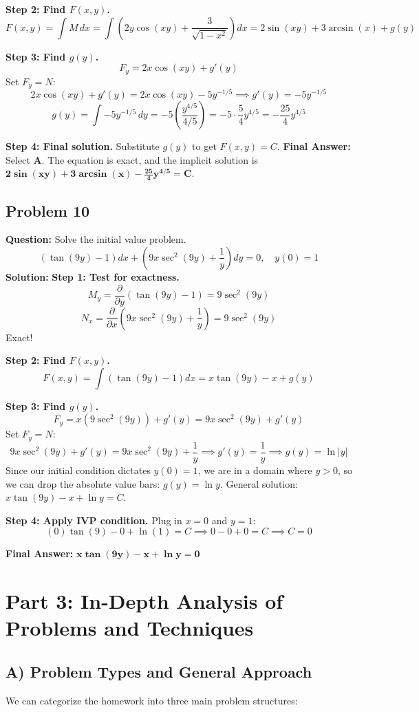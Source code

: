 \documentclass[11pt]{article}
\begin{document}
\textbf{Step 2: Find $F(x,y)$.}
\[ F(x,y) = \int M \, dx = \int \left( 2y \cos(xy) + \frac{3}{\sqrt{1-x^2}} \right) dx = 2\sin(xy) + 3\arcsin(x) + g(y) \]

\textbf{Step 3: Find $g(y)$.}
\[ F_y = 2x \cos(xy) + g'(y) \]
Set $F_y = N$:
\[ 2x \cos(xy) + g'(y) = 2x \cos(xy) - 5y^{-1/5} \implies g'(y) = -5y^{-1/5} \]
\[ g(y) = \int -5y^{-1/5} \, dy = -5 \left( \frac{y^{4/5}}{4/5} \right) = -5 \cdot \frac{5}{4} y^{4/5} = -\frac{25}{4}y^{4/5} \]

\textbf{Step 4: Final solution.}
Substitute $g(y)$ to get $F(x,y) = C$.
\textbf{Final Answer:} Select \textbf{A}. The equation is exact, and the implicit solution is $\mathbf{2\sin(xy) + 3\arcsin(x) - \frac{25}{4}y^{4/5} = C}$.

\vspace{0.5cm}
\subsection*{Problem 10}
\textbf{Question:} Solve the initial value problem.
\[ (\tan(9y) - 1) dx + \left( 9x \sec^2(9y) + \frac{1}{y} \right) dy = 0, \quad y(0) = 1 \]
\textbf{Solution:}
\textbf{Step 1: Test for exactness.}
\[ M_y = \frac{\partial}{\partial y}(\tan(9y) - 1) = 9\sec^2(9y) \]
\[ N_x = \frac{\partial}{\partial x}\left(9x \sec^2(9y) + \frac{1}{y}\right) = 9\sec^2(9y) \]
Exact!

\textbf{Step 2: Find $F(x,y)$.}
\[ F(x,y) = \int (\tan(9y) - 1) dx = x\tan(9y) - x + g(y) \]

\textbf{Step 3: Find $g(y)$.}
\[ F_y = x(9\sec^2(9y)) + g'(y) = 9x \sec^2(9y) + g'(y) \]
Set $F_y = N$:
\[ 9x \sec^2(9y) + g'(y) = 9x \sec^2(9y) + \frac{1}{y} \implies g'(y) = \frac{1}{y} \implies g(y) = \ln|y| \]
Since our initial condition dictates $y(0) = 1$, we are in a domain where $y > 0$, so we can drop the absolute value bars: $g(y) = \ln y$.
General solution: $x\tan(9y) - x + \ln y = C$.

\textbf{Step 4: Apply IVP condition.}
Plug in $x = 0$ and $y = 1$:
\[ (0)\tan(9) - 0 + \ln(1) = C \implies 0 - 0 + 0 = C \implies C = 0 \]

\textbf{Final Answer:} $\mathbf{x\tan(9y) - x + \ln y = 0}$

\newpage
\section{Part 3: In-Depth Analysis of Problems and Techniques}

\subsection{A) Problem Types and General Approach}
We can categorize the homework into three main problem structures:
\end{document}
